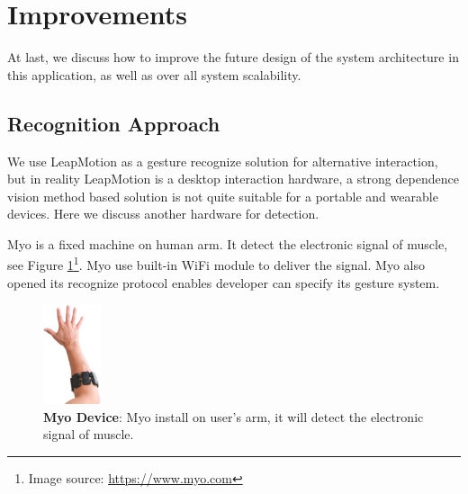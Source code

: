 \section{Improvements}

At last, we discuss how to improve the future design of the system architecture in this application, as well as over all system scalability.

\subsection{Recognition Approach}

We use LeapMotion as a gesture recognize solution for alternative interaction, but in reality LeapMotion is a desktop interaction hardware, a strong dependence vision method based solution is not quite suitable for a portable and wearable devices. Here we discuss another hardware for detection.

Myo \cite{Myo:2016} is a fixed machine on human arm. It detect the electronic signal of muscle, see Figure \ref{fig:myo}\footnote{Image source: \url{https://www.myo.com}}. Myo use built-in WiFi module to deliver the signal. Myo also opened its recognize protocol enables developer can specify its gesture system.

\begin{figure}[H]
    \kaishu
    \centering
    \includegraphics[width=0.15\textwidth]{figures/myo}
    \caption{\kaishu \textbf{Myo Device}: Myo install on user's arm, it will detect the electronic signal of muscle.}
    \label{fig:myo}
\end{figure}

